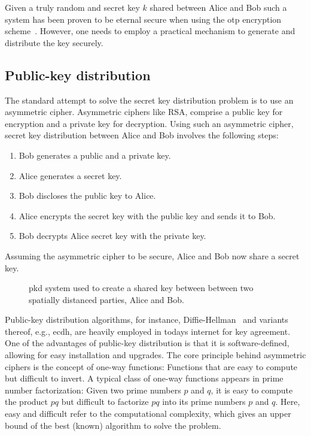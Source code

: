 Given a truly random and secret key $k$ shared between Alice and Bob such a system has been proven to be eternal secure when using the \gls{otp} encryption scheme~\cite{Shannon1949}.
However, one needs to employ a practical mechanism to generate and distribute the key securely.

\FloatBarrier
\subsection{Public-key distribution}

The standard attempt to solve the secret key distribution problem is to use an asymmetric cipher.
Asymmetric ciphers like RSA, comprise a public key for encryption and a private key for decryption.
Using such an asymmetric cipher, secret key distribution between Alice and Bob involves the following steps:
\begin{enumerate}
	\item Bob generates a public and a private key.
	\item Alice generates a secret key.
	\item Bob discloses the public key to Alice.
	\item Alice encrypts the secret key with the public key and sends it to Bob.
	\item Bob decrypts Alice secret key with the private key.
\end{enumerate}
Assuming the asymmetric cipher to be secure, Alice and Bob now share a secret key.
\begin{figure}[htb]
	\centering
	
	\caption{\Gls{pkd} system used to create a shared key between between two spatially distanced parties, Alice and Bob.}\label{fig:pkd_system}
\end{figure}
Public-key distribution algorithms, for instance, Diffie-Hellman~\cite{Diffie1976} and variants thereof, e.g., \gls{ecdh}, are heavily employed in todays internet for key agreement.
One of the advantages of public-key distribution is that it is software-defined, allowing for easy installation and upgrades.
The core principle behind asymmetric ciphers is the concept of one-way functions:
Functions that are easy to compute but difficult to invert.
A typical class of one-way functions appears in prime number factorization: Given two prime numbers $p$ and $q$, it is easy to compute the product $pq$ but difficult to factorize $pq$ into its prime numbers $p$ and $q$.
Here, easy and difficult refer to the computational complexity, which gives an upper bound of the best (known) algorithm to solve the problem.
